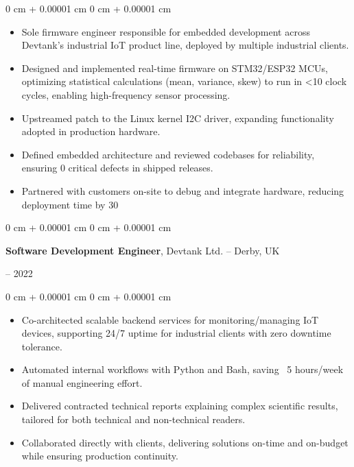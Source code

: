 \documentclass[10pt, letterpaper]{article}
\newenvironment{highlights}{
    \begin{itemize}[
        topsep=0.15 cm,
        parsep=0.15 cm,
        partopsep=0pt,
        itemsep=0pt,
        leftmargin=0 cm + 10pt
    ]
}{
    \end{itemize}
}
\newenvironment{onecolentry}{
    \begin{adjustwidth}{
        0 cm + 0.00001 cm
    }{
        0 cm + 0.00001 cm
    }
}{
    \end{adjustwidth}
}
\newenvironment{twocolentry}[2][]{
    \onecolentry
    \def\secondColumn{#2}
    \setcolumnwidth{\fill, 4.5 cm}
    \begin{paracol}{2}
}{
    \switchcolumn \raggedleft \secondColumn
    \end{paracol}
    \endonecolentry
}
\begin{document}
        \vspace{0.10 cm}
        \begin{onecolentry}
            \begin{highlights}
                \item Sole firmware engineer responsible for embedded development across Devtank’s industrial IoT product line, deployed by multiple industrial clients.
                \item Designed and implemented real-time firmware on STM32/ESP32 MCUs, optimizing statistical calculations (mean, variance, skew) to run in <10 clock cycles, enabling high-frequency sensor processing.
                \item Upstreamed patch to the Linux kernel I2C driver, expanding functionality adopted in production hardware.
                \item Defined embedded architecture and reviewed codebases for reliability, ensuring 0 critical defects in shipped releases.
                \item Partnered with customers on-site to debug and integrate hardware, reducing deployment time by 30%
            \end{highlights}
        \end{onecolentry}


        \vspace{0.2 cm}

        \begin{twocolentry}{
            2020 – 2022
        }
            \textbf{Software Development Engineer}, Devtank Ltd. -- Derby, UK
        \end{twocolentry}

        \vspace{0.10 cm}
        \begin{onecolentry}
            \begin{highlights}
                \item Co-architected scalable backend services for monitoring/managing IoT devices, supporting 24/7 uptime for industrial clients with zero downtime tolerance.
                \item Automated internal workflows with Python and Bash, saving ~5 hours/week of manual engineering effort.
                \item Delivered contracted technical reports explaining complex scientific results, tailored for both technical and non-technical readers.
                \item Collaborated directly with clients, delivering solutions on-time and on-budget while ensuring production continuity.
            \end{highlights}
        \end{onecolentry}
\end{document}
